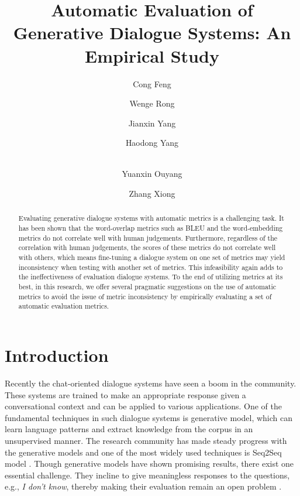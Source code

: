 \documentclass[runningheads]{llncs}
\begin{document}
    \title{Automatic Evaluation of Generative Dialogue Systems: An Empirical Study}
    \author{Cong Feng \and Wenge Rong \and Jianxin Yang \and Haodong Yang \and \\Yuanxin Ouyang \and Zhang Xiong}

    \maketitle

\begin{abstract}
Evaluating generative dialogue systems with automatic metrics is a challenging task. It has been shown that the word-overlap metrics such as BLEU and the word-embedding metrics do not correlate well with human judgements. Furthermore, regardless of the correlation with human judgements, the scores of these metrics do not correlate well with others, which means fine-tuning a dialogue system on one set of metrics may yield inconsistency when testing with another set of metrics. This infeasibility again adds to the ineffectiveness of evaluation dialogue systems. To the end of utilizing metrics at its best, in this research, we offer several pragmatic suggestions on the use of automatic metrics to avoid the issue of metric inconsistency by empirically evaluating a set of automatic evaluation metrics.
\end{abstract}

\section{Introduction}
Recently the chat-oriented dialogue systems have seen a boom in the community. These systems are trained to make an appropriate response given a conversational context and can be applied to various applications. One of the fundamental techniques in such dialogue systems is generative model, which can learn language patterns and extract knowledge from the corpus in an unsupervised manner. The research community has made steady progress with the generative models and one of the most widely used techniques is Seq2Seq model \cite{Seq2Seq}. Though generative models have shown promising results, there exist one essential challenge. They incline to give meaningless responses to the questions, e.g., \textit{I don't know}, thereby making their evaluation remain an open problem \cite{HowNot}.
\end{document}
